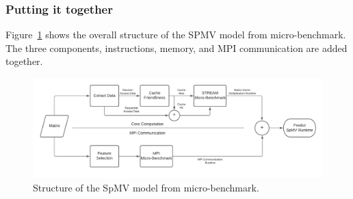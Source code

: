 \documentclass[sigconf,review,anonymous]{acmart}
\begin{document}

\subsubsection{Putting it together}

Figure~\ref{fig:spmv-model-from-benchmark} shows the overall structure
of the SPMV model from micro-benchmark.  The three components,
instructions, memory, and MPI communication are added together.

\begin{figure}[hbt!]
	\centering
	\includegraphics[width=0.96\linewidth]{figures/spmv_hardware_model.pdf}
	\caption{Structure of the SpMV model from micro-benchmark.}
	\label{fig:spmv-model-from-benchmark}
\end{figure}
\end{document}

